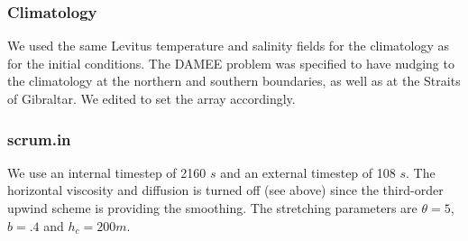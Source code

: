 \subsubsection{Climatology}
We used the same Levitus temperature and salinity fields for the
climatology as for the initial conditions.  The DAMEE problem was
specified to have nudging to the climatology at the northern and
southern boundaries, as well as at the Straits of Gibraltar.  We
edited  to set the  array
accordingly.

\subsubsection{scrum.in}
We use an internal timestep of 2160 $s$ and an external timestep of 108
$s$.  The horizontal viscosity and diffusion is turned off (see above)
since the third-order upwind scheme is providing the smoothing.
The stretching parameters are $\theta = 5$, $b = .4$ and $h_c = 200 m$.

